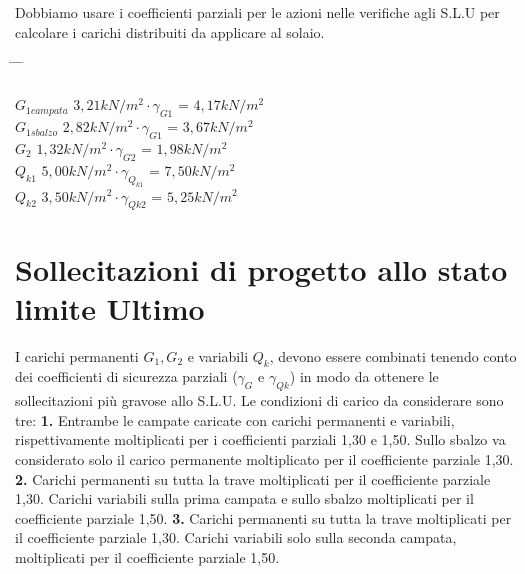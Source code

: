 \documentclass[a4paper,12pt, oneside]{book}
\begin{document}
    Dobbiamo usare i coefficienti parziali per le azioni nelle verifiche agli S.L.U per calcolare i carichi distribuiti da applicare al solaio.
    
    \begin{tabbing}
    	\phantom{Campata} \hspace{1em} \= \hspace{10em} \= \hspace{2em} \= \hspace{1em}\\\\
    	$G_{1campata}$    \> $3,21kN/m^2\cdot\gamma_{G1}$ \> = \> $4,17kN/m^2$ \\
    	$G_{1sbalzo}$     \> $2,82kN/m^2\cdot\gamma_{G1}$ \> = \> $3,67kN/m^2$ \\
    	$G_2$    \> $1,32kN/m^2\cdot\gamma_{G2}$ \> = \> $1,98kN/m^2$ \\ 
    	$Q_{k1}$ \> $5,00kN/m^2\cdot\gamma_{Q_{k1}}$ \> = \> $7,50kN/m^2$ \\       
    	$Q_{k2}$ \> $3,50kN/m^2\cdot\gamma_{Q{k2}}$ \> = \> $5,25kN/m^2$                    
    \end{tabbing}	
    
    \chapter{Sollecitazioni di progetto allo stato limite Ultimo}
    
    I carichi permanenti $G_1, G_2$ e variabili $Q_k$, devono essere combinati tenendo conto dei coefficienti di sicurezza parziali ($\gamma_{G}$ e $\gamma_{Qk}$) in modo da ottenere le sollecitazioni più gravose allo S.L.U. Le condizioni di carico da considerare sono tre:
    \leavevmode\newline
    \leavevmode\newline
    \phantom{12}\textbf{1.} Entrambe le campate caricate con carichi permanenti e variabili, rispettivamente moltiplicati per i coefficienti parziali 1,30 e 1,50. Sullo sbalzo va considerato solo il carico permanente moltiplicato per il coefficiente parziale 1,30.
    \leavevmode\newline
    \phantom{12}\textbf{2.} Carichi permanenti su tutta la trave moltiplicati per il coefficiente parziale 1,30. Carichi variabili sulla prima campata e sullo sbalzo moltiplicati per il coefficiente parziale 1,50. 
    \leavevmode\newline
    \phantom{12}\textbf{3.} Carichi permanenti su tutta la trave moltiplicati per il coefficiente parziale 1,30. Carichi variabili solo sulla seconda campata, moltiplicati per il coefficiente parziale 1,50.
    
\end{document}
